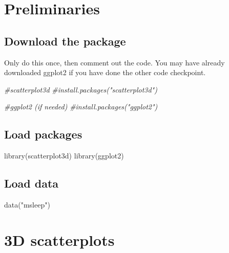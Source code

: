 \documentclass[
]{book}
\newenvironment{Shaded}{\begin{snugshade}}{\end{snugshade}}
\newcommand{\CommentTok}[1]{\textcolor[rgb]{0.56,0.35,0.01}{\textit{#1}}}
\newcommand{\FunctionTok}[1]{\textcolor[rgb]{0.00,0.00,0.00}{#1}}
\newcommand{\NormalTok}[1]{#1}
\newcommand{\StringTok}[1]{\textcolor[rgb]{0.31,0.60,0.02}{#1}}
\begin{document}
\hypertarget{preliminaries-7}{%
\section{Preliminaries}\label{preliminaries-7}}

\hypertarget{download-the-package}{%
\subsection{Download the package}\label{download-the-package}}

Only do this once, then comment out the code. You may have already downloaded ggplot2 if you have done the other code checkpoint.

\begin{Shaded}
\begin{Highlighting}[]
\CommentTok{\#scatterplot3d}
\CommentTok{\#install.packages("scatterplot3d")}

\CommentTok{\#ggplot2 (if needed)}
\CommentTok{\#install.packages("ggplot2")}
\end{Highlighting}
\end{Shaded}

\hypertarget{load-packages}{%
\subsection{Load packages}\label{load-packages}}

\begin{Shaded}
\begin{Highlighting}[]
\FunctionTok{library}\NormalTok{(scatterplot3d)}
\FunctionTok{library}\NormalTok{(ggplot2)}
\end{Highlighting}
\end{Shaded}

\hypertarget{load-data}{%
\subsection{Load data}\label{load-data}}

\begin{Shaded}
\begin{Highlighting}[]
\FunctionTok{data}\NormalTok{(}\StringTok{"msleep"}\NormalTok{)}
\end{Highlighting}
\end{Shaded}

\hypertarget{d-scatterplots-1}{%
\section{3D scatterplots}\label{d-scatterplots-1}}
\end{document}
